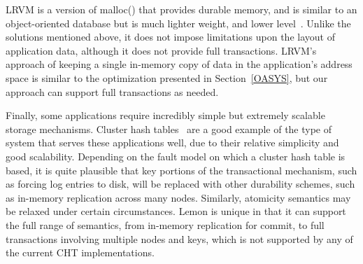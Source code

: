 \documentclass[10pt,letterpaper,twocolumn,english]{article}
\newcommand{\yad}{Lemon\xspace}
\begin{document}
LRVM is a version of malloc() that provides
durable memory, and is similar to an object-oriented database
but is much lighter weight, and lower level~\cite{lrvm}.  Unlike 
the solutions mentioned above, it does not impose limitations upon 
the layout of application data, although it does not provide full transactions.
LRVM's
approach of keeping a single in-memory copy of data in the application's
address space is similar to the optimization presented in
Section~\ref{OASYS}, but our approach can support full transactions as needed.



Finally, some applications require incredibly simple but extremely
scalable storage mechanisms.  Cluster hash tables~\cite{cht} are a
good example of the type of system that serves these applications
well, due to their relative simplicity and good scalability.
Depending on the fault model on which a cluster hash table is based,
it is quite plausible that key portions of the transactional
mechanism, such as forcing log entries to disk, will be replaced with
other durability schemes, such as in-memory replication across many
nodes.  Similarly, atomicity semantics may be relaxed under certain
circumstances.  \yad is unique in that it can support the full range
of semantics, from in-memory replication for commit, to full
transactions involving multiple nodes and keys, which is not supported
by any of the current CHT implementations.
\end{document}
